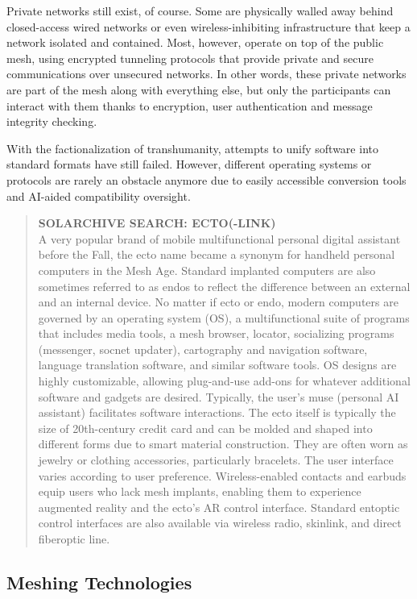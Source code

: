 Private networks still exist, of course. Some are 
physically walled away behind closed-access wired networks
or even wireless-inhibiting infrastructure that
keep a network isolated and contained. Most, however, 
operate on top of the public mesh, using encrypted 
tunneling protocols that provide private and secure 
communications over unsecured networks. In other 
words, these private networks are part of the mesh 
along with everything else, but only the participants 
can interact with them thanks to encryption, user authentication
and message integrity checking.

With the factionalization of transhumanity, attempts
to unify software into standard formats have
still failed. However, different operating systems 
or protocols are rarely an obstacle anymore due to 
easily accessible conversion tools and AI-aided compatibility
oversight.

\begin{quotation}
\textbf{SOLARCHIVE SEARCH: ECTO(-LINK)}
\\
A very popular brand of mobile multifunctional
personal digital assistant
before the Fall, the ecto name became
a synonym for handheld personal
computers in the Mesh Age. Standard
implanted computers are also sometimes
referred to as endos to reflect
the difference between an external
and an internal device.
No matter if ecto or endo, modern
computers are governed by an operating
system (OS), a multifunctional
suite of programs that includes media
tools, a mesh browser, locator, socializing
programs (messenger, socnet
updater), cartography and navigation
software, language translation
software, and similar software tools.
OS designs are highly customizable,
allowing plug-and-use add-ons for
whatever additional software and
gadgets are desired. Typically, the
user’s muse (personal AI assistant)
facilitates software interactions.
The ecto itself is typically the size
of 20th-century credit card and can
be molded and shaped into different
forms due to smart material construction.
They are often worn as jewelry or
clothing accessories, particularly bracelets.
The user interface varies according
to user preference. Wireless-enabled
contacts and earbuds equip users who
lack mesh implants, enabling them to
experience augmented reality and the
ecto’s AR control interface. Standard
entoptic control interfaces are also
available via wireless radio, skinlink,
and direct fiberoptic line.
\end{quotation}


\subsection{Meshing Technologies}


